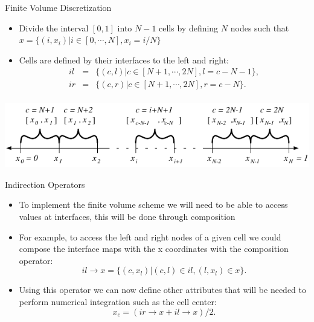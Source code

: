 \documentclass{beamer}
\begin{document}
\begin{frame}{Finite Volume Discretization}
\begin{itemize}
\item Divide the interval $[0,1]$ into  $N-1$ cells by defining $N$ nodes such that $x = \lbrace (i,x_i) | i \in [0, \cdots, N], x_i = i/N \rbrace$
\item Cells are defined by their interfaces to the left and right:
\begin{equation*}
\begin{array}{rcl}
il & = & \lbrace (c,l) | c \in [N+1, \cdots, 2N], l = c-N-1 \rbrace,\\
ir & = & \lbrace (c,r) | c \in [N+1, \cdots, 2N], r = c-N \rbrace.\\
\end{array}
\end{equation*}
\end{itemize}
\begin{center}
\includegraphics[height=.75in]{Figures/one-d}
\end{center}
\end{frame}
\begin{frame}{Indirection Operators}
\begin{itemize}
  \item To implement the finite volume scheme we will need to be able to access values at interfaces, this will be done through composition
  \item For example, to access the left and right nodes of a given cell we could compose the interface maps with the x coordinates with the composition operator:
\begin{equation*}
il\rightarrow x = \lbrace (c,x_l) | (c,l) \in il, (l,x_l) \in x \rbrace.
\end{equation*}
\item Using this operator we can now define other attributes that will be needed to perform numerical integration such as the cell center:
\begin{equation*}
x_c = (ir \rightarrow x + il \rightarrow x)/2.
\end{equation*}
\end{itemize}
\end{frame}
\end{document}
